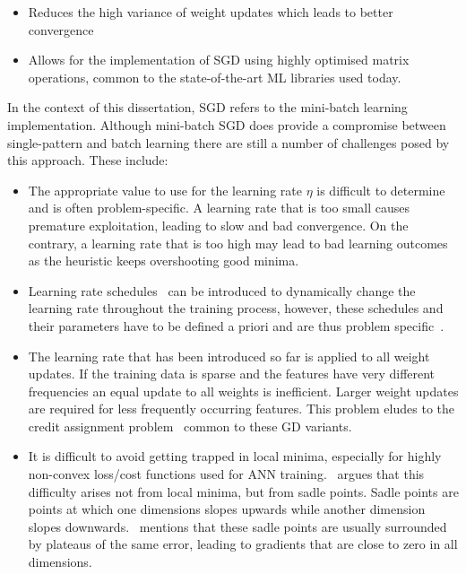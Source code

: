 \begin{itemize}
      \item Reduces the high variance of weight updates which leads to better convergence
      \item Allows for the implementation of \ac{SGD} using highly optimised matrix operations, common to the state-of-the-art \ac{ML} libraries used today.
\end{itemize}

In the context of this dissertation, \ac{SGD} refers to the mini-batch learning implementation. Although mini-batch \ac{SGD} does provide a compromise between single-pattern and batch learning there are still a number of challenges posed by this approach. These include:

\begin{itemize}
      \item The appropriate value to use for the learning rate $\eta$ is difficult to determine and is often problem-specific. A learning rate that is too small causes premature exploitation, leading to slow and bad convergence. On the contrary, a learning rate that is too high may lead to bad learning outcomes as the heuristic keeps overshooting good minima.

      \item Learning rate schedules~\cite{ref:robbins:1951} can be introduced to dynamically change the learning rate throughout the training process, however, these schedules and their parameters have to be defined a priori and are thus problem specific~\cite{ref:darken:1992}.

      \item The learning rate that has been introduced so far is applied to all weight updates. If the training data is sparse and the features have very different frequencies an equal update to all weights is inefficient. Larger weight updates are required for less frequently occurring features. This problem eludes to the credit assignment problem~\cite{ref:rumelhart:1986} common to these \ac{GD} variants.

      \item It is difficult to avoid getting trapped in local minima, especially for highly non-convex loss/cost functions used for \ac{ANN} training.~\cite{ref:dauphin:2014} argues that this difficulty arises not from local minima, but from sadle points. Sadle points are points at which one dimensions slopes upwards while another dimension slopes downwards.~\cite{ref:ruder:2016} mentions that these sadle points are usually surrounded by plateaus of the same error, leading to gradients that are close to zero in all dimensions.
\end{itemize}


